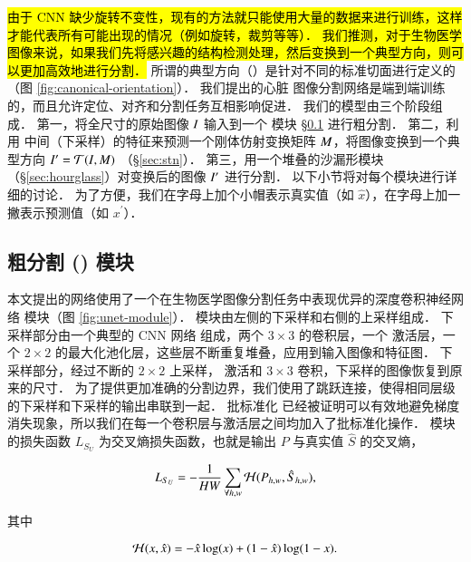 
\hl{
由于 CNN 缺少旋转不变性，现有的方法就只能使用大量的数据来进行训练，这样才能代表所有可能出现的情况（例如旋转，裁剪等等）．
我们推测，对于生物医学图像来说，如果我们先将感兴趣的结构检测处理，然后变换到一个典型方向，则可以更加高效地进行分割．
}
所谓的典型方向（\CMR{}）是针对不同的标准切面进行定义的（图 \ref{fig:canonical-orientation}）．
我们提出的心脏 \SSFP{} 图像分割网络是端到端训练的，而且允许定位、对齐和分割任务互相影响促进．
我们的模型由三个阶段组成．
第一，将全尺寸的原始图像 $I$ 输入到一个 \UNet{} 模块 \S \ref{sec:unet} 进行粗分割． 
第二，利用 \UNet{} 中间（下采样）的特征来预测一个刚体仿射变换矩阵 $M$，将图像变换到一个典型方向 $I^\prime = \mathcal{T}(I, M)$ （\S\ref{sec:stn}）．
第三，用一个堆叠的沙漏形模块（\S\ref{sec:hourglass}）对变换后的图像 $I^\prime$ 进行分割．
以下小节将对每个模块进行详细的讨论．
为了方便，我们在字母上加个小帽表示真实值（如 $\hat{x}$），在字母上加一撇表示预测值（如 $x^\prime$）．

\subsection{粗分割 (\UNet{}) 模块}\label{sec:unet}



本文提出的网络使用了一个在生物医学图像分割任务\citep{Long2015,Ronneberger2015,Xie2015}中表现优异的深度卷积神经网络 \UNet{} 模块（图 \ref{fig:unet-module}）．
\UNet{} 模块由左侧的下采样和右侧的上采样组成．
下采样部分由一个典型的 CNN 网络 \citep{Krizhevsky2012,Simonyan2015} 组成，两个 $3 \times 3$ 的卷积层，一个 \ReLU{} 激活层，一个 $2 \times 2$ 的最大化池化层，这些层不断重复堆叠，应用到输入图像和特征图．
下采样部分，经过不断的 $2 \times 2$ 上采样，\ReLU{} 激活和 $3 \times 3$ 卷积，下采样的图像恢复到原来的尺寸．
为了提供更加准确的分割边界，我们使用了跳跃连接，使得相同层级的下采样和下采样的输出串联到一起．
批标准化 \mbox{\citep{Ioffe2015}} 已经被证明可以有效地避免梯度消失现象，所以我们在每一个卷积层与激活层之间均加入了批标准化操作．
\UNet{} 模块的损失函数 $L_{S_U}$ 为交叉熵损失函数，也就是输出 $P$ 与真实值 $\hat{S}$ 的交叉熵，

\begin{equation}\label{eqn:unet-loss}
L_{S_U} = -\frac{1}{HW} \sum_{\forall h,w} \mathcal{H}(P_{h,w}, \hat{S}_{h,w}),
\end{equation}

\noindent 其中

\begin{equation}\label{eqn:cross-entropy}
\mathcal{H}(x, \hat{x}) = - \hat{x} \log(x) + (1 - \hat{x}) \log(1 - x).
\end{equation}

